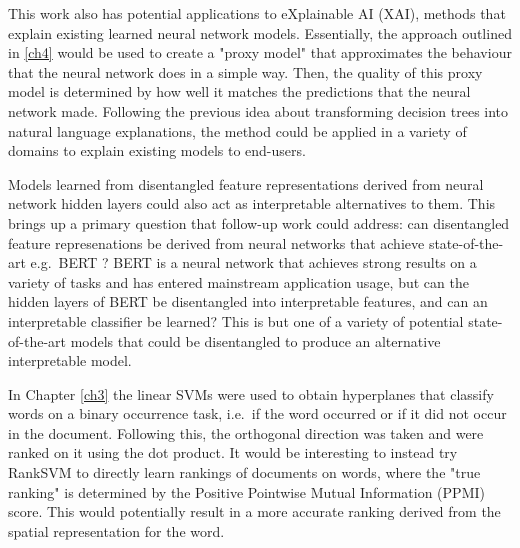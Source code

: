 
This work also has potential applications  to eXplainable AI (XAI), methods that explain existing learned neural network models. Essentially, the approach outlined in  \ref{ch4} would be used to create a "proxy model" that approximates the  behaviour that the neural network does in a simple way. Then, the quality of this proxy model is determined by how well it matches the predictions that the neural network made. Following the previous idea about transforming decision trees into natural language explanations, the method could be applied in a variety of domains to explain existing models to end-users.


Models learned from disentangled feature representations derived from neural network hidden layers could also act as interpretable alternatives to them. This brings up a primary question that follow-up work could address: can disentangled feature represenations be derived from neural networks that achieve state-of-the-art e.g.\ BERT \cite{Kenton1953}? BERT is a neural network that achieves strong results on a variety of tasks and has entered mainstream application usage,  but can the hidden layers of BERT be disentangled into interpretable features, and can an interpretable classifier be learned? This is but one of a variety of potential  state-of-the-art models that could be disentangled  to produce an alternative interpretable model.


In Chapter \ref{ch3} the linear SVMs were used to obtain hyperplanes that classify words on a binary occurrence task, i.e.\ if the word occurred or if it did not occur in the document. Following this, the orthogonal direction was taken and  were ranked on it using the dot product. It would be interesting to instead try RankSVM \cite{Lee2012} to directly learn rankings of documents on words, where the "true ranking" is determined by the Positive Pointwise Mutual Information (PPMI) score. This would potentially result in a more accurate ranking derived from the spatial representation for the word.


